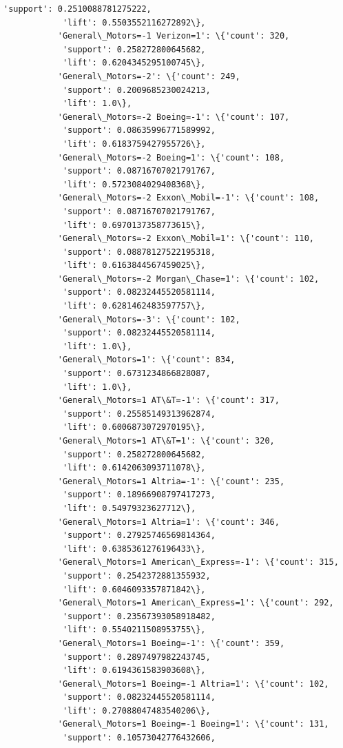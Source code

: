 \documentclass[11pt]{article}
\begin{document}
\begin{Verbatim}[commandchars=\\\{\}]
            'support': 0.2510088781275222,
            'lift': 0.5503552116272892\},
           'General\_Motors=-1 Verizon=1': \{'count': 320,
            'support': 0.258272800645682,
            'lift': 0.6204345295100745\},
           'General\_Motors=-2': \{'count': 249,
            'support': 0.2009685230024213,
            'lift': 1.0\},
           'General\_Motors=-2 Boeing=-1': \{'count': 107,
            'support': 0.08635996771589992,
            'lift': 0.6183759427955726\},
           'General\_Motors=-2 Boeing=1': \{'count': 108,
            'support': 0.08716707021791767,
            'lift': 0.5723084029408368\},
           'General\_Motors=-2 Exxon\_Mobil=-1': \{'count': 108,
            'support': 0.08716707021791767,
            'lift': 0.6970137358773615\},
           'General\_Motors=-2 Exxon\_Mobil=1': \{'count': 110,
            'support': 0.08878127522195318,
            'lift': 0.6163844567459025\},
           'General\_Motors=-2 Morgan\_Chase=1': \{'count': 102,
            'support': 0.08232445520581114,
            'lift': 0.6281462483597757\},
           'General\_Motors=-3': \{'count': 102,
            'support': 0.08232445520581114,
            'lift': 1.0\},
           'General\_Motors=1': \{'count': 834,
            'support': 0.6731234866828087,
            'lift': 1.0\},
           'General\_Motors=1 AT\&T=-1': \{'count': 317,
            'support': 0.25585149313962874,
            'lift': 0.6006873072970195\},
           'General\_Motors=1 AT\&T=1': \{'count': 320,
            'support': 0.258272800645682,
            'lift': 0.6142063093711078\},
           'General\_Motors=1 Altria=-1': \{'count': 235,
            'support': 0.18966908797417273,
            'lift': 0.54979323627712\},
           'General\_Motors=1 Altria=1': \{'count': 346,
            'support': 0.27925746569814364,
            'lift': 0.6385361276196433\},
           'General\_Motors=1 American\_Express=-1': \{'count': 315,
            'support': 0.2542372881355932,
            'lift': 0.6046093357871842\},
           'General\_Motors=1 American\_Express=1': \{'count': 292,
            'support': 0.23567393058918482,
            'lift': 0.5540211508953755\},
           'General\_Motors=1 Boeing=-1': \{'count': 359,
            'support': 0.2897497982243745,
            'lift': 0.6194361583903608\},
           'General\_Motors=1 Boeing=-1 Altria=1': \{'count': 102,
            'support': 0.08232445520581114,
            'lift': 0.27088047483540206\},
           'General\_Motors=1 Boeing=-1 Boeing=1': \{'count': 131,
            'support': 0.10573042776432606,

\end{Verbatim}
\end{document}
